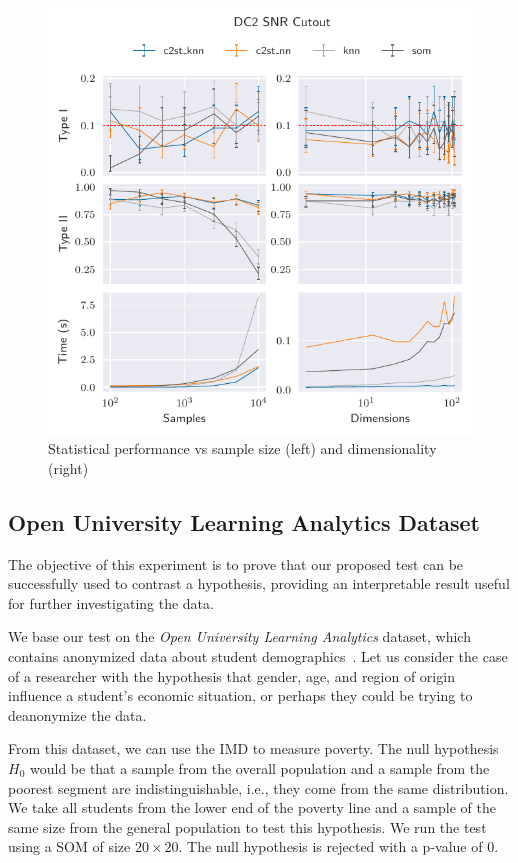 \begin{figure}[htbp]
    \centering
    \includegraphics{images/6_som/dc2_snr}
    \caption[Statistical performance vs sample size and dimensionality.]{
    Statistical performance vs sample size (left) and dimensionality (right)}
    \label{fig:dc2_snr}
\end{figure}

\subsection{Open University Learning Analytics Dataset}
\label{subsec:som_oulad}
The objective of this experiment is to prove that our proposed test can be successfully
used to contrast a hypothesis, providing an interpretable result useful for further
investigating the data.

We base our test on the \emph{Open University Learning Analytics}
dataset, which contains anonymized data about student demographics~\cite{kuzilek_open_2017}.
Let us consider the case of a researcher with the hypothesis that gender, age, and
region of origin influence a student's economic situation, or perhaps they could
be trying to deanonymize the data.

From this dataset, we can use the \gls{IMD} to measure poverty.
The null hypothesis $H_0$ would be that a sample from the overall population and a sample from
the poorest segment are indistinguishable, i.e., they come from the same distribution.
We take all students from the lower end of the poverty line and a sample of the same size
from the general population to test this hypothesis. We run the test using a \gls{SOM}  of size
$20\times20$. The null hypothesis is rejected with a p-value of $0$.

